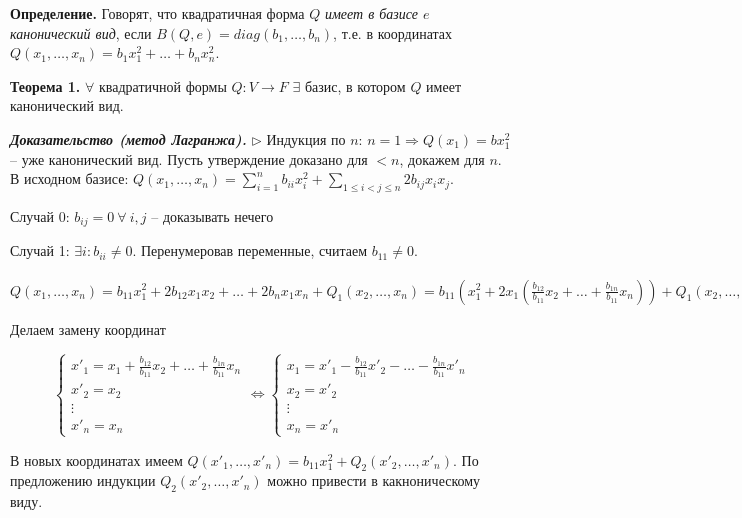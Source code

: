 \vspace{\baselineskip}
\textbf{Определение.} Говорят, что квадратичная форма $Q$ \textit{имеет в базисе $e$ канонический вид}, если $B(Q, e) = diag(b_1,\dots, b_n)$, т.е. в координатах $Q(x_1, \dots, x_n) = b_1 x_1^2 + \dots + b_n x_n^2$.

\vspace{\baselineskip}
\textbf{Теорема 1.} $\forall$ квадратичной формы $Q: V \rightarrow F$ $\exists$ базис,  в котором $Q$ имеет канонический вид.

\vspace{\baselineskip}
\textbf{\textit{Доказательство (метод Лагранжа).}} $\rhd$ Индукция по $n$: $n=1 \Rightarrow Q(x_1) = b x_1^2$ -- уже канонический вид. Пусть утверждение доказано для $<n$, докажем для $n$. В исходном базисе: $Q(x_1, \dots, x_n) = \sum\limits_{i=1}^n b_{ii} x_i^2 + \sum\limits_{1 \leq i < j \leq n} 2b_{ij} x_i x_j$.

Случай 0: $b_{ij} = 0 \ \forall \ i,j$ -- доказывать нечего

Случай 1: $\exists i : b_{ii} \neq 0$. Перенумеровав переменные, считаем $b_{11} \neq 0$.

$Q(x_1, \dots, x_n) = b_{11} x_1^2 + 2b_{12} x_1 x_2 + \dots + 2b_n x_1 x_n + Q_1(x_2, \dots, x_n) = b_{11}(x_1^2 + 2x_1(\frac{b_{12}}{b_{11}} x_2 + \dots + \frac{b_{1n}}{b_{11}} x_n )) + Q_1(x_2, \dots, x_n) = b_{11} (x_1 + \frac{b{12}}{b_{11}} x_2 + \dots + \frac{b_{1n}}{b_{11}} x_n)^2 - b_{11} (\frac{b_{12}}{b_{11}} x_2 + \dots + \frac{b_{12}}{b_{11}} + \dots + \frac{b_{1n}}{b_{11}} x_n) ^2 + Q_1(x_2, \dots, x_n)$

Делаем замену координат

\[
 \begin{cases}
		x'_1 = x_1 + \frac{b_{12}}{b_{11}} x_2 + \dots + \frac{b_{1n}}{b_{11}} x_n \\
		x'_2 = x_2 \\
        \vdots \\
        x'_n = x_n
	\end{cases} \Leftrightarrow \begin{cases}
		x_1 = x'_1 - \frac{b_{12}}{b_{11}} x'_2 - \dots - \frac{b_{1n}}{b_{11}} x'_n \\
		x_2 = x'_2 \\
        \vdots \\
        x_n = x'_n
	\end{cases}
\]

В новых координатах имеем $Q(x'_1, \dots, x'_n) = b_{11}x_1^2 + Q_2 (x'_2, \dots, x'_n)$. По предложению индукции $Q_2(x'_2, \dots, x'_n)$ можно привести в какноническому виду.


